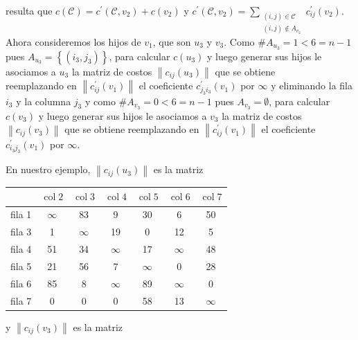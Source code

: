 \documentclass[10pt]{article}
\begin{document}
resulta que $c(\mathcal{C})=c^{\prime}\left(\mathcal{C}, v_{2}\right)+c\left(v_{2}\right)$ y $c^{\prime}\left(\mathcal{C}, v_{2}\right)=\sum_{\substack{(i, j) \in \mathcal{C} \\(i, j) \notin A_{v_{2}}}} c_{i j}^{\prime}\left(v_{2}\right)$.\\
Ahora consideremos los hijos de $v_{1}$, que son $u_{3}$ y $v_{3}$. Como $\# A_{u_{3}}=1<6=n-1$ pues $A_{u_{3}}=\left\{\left(i_{3}, j_{3}\right)\right\}$, para calcular $c\left(u_{3}\right)$ y luego generar sus hijos le asociamos a $u_{3}$ la matriz de costos $\left\|c_{i j}\left(u_{3}\right)\right\|$ que se obtiene\\
reemplazando en $\left\|c_{i j}^{\prime}\left(v_{1}\right)\right\|$ el coeficiente $c_{j_{3} i_{3}}^{\prime}\left(v_{1}\right)$ por $\infty$ y eliminando la fila $i_{3}$ y la columna $j_{3}$ y como $\# A_{v_{3}}=0<6=n-1$ pues $A_{v_{3}}=\emptyset$, para calcular $c\left(v_{3}\right)$ y luego generar sus hijos le asociamos a $v_{3}$ la matriz de costos $\left\|c_{i j}\left(v_{3}\right)\right\|$ que se obtiene reemplazando en $\left\|c_{i j}^{\prime}\left(v_{1}\right)\right\|$ el coeficiente $c_{i_{3} j_{3}}^{\prime}\left(v_{1}\right)$ por $\infty$.

En nuestro ejemplo, $\left\|c_{i j}\left(u_{3}\right)\right\|$ es la matriz

\begin{center}
\begin{tabular}{|c|c|c|c|c|c|c|}
\hline
 & $\operatorname{col} 2$ & $\operatorname{col} 3$ & $\operatorname{col} 4$ & $\operatorname{col} 5$ & $\operatorname{col} 6$ & $\operatorname{col} 7$ \\
\hline
fila 1 & $\infty$ & 83 & 9 & 30 & 6 & 50 \\
\hline
fila 3 & 1 & $\infty$ & 19 & 0 & 12 & 5 \\
\hline
fila 4 & 51 & 34 & $\infty$ & 17 & $\infty$ & 48 \\
\hline
fila 5 & 21 & 56 & 7 & $\infty$ & 0 & 28 \\
\hline
fila 6 & 85 & 8 & $\infty$ & 89 & $\infty$ & 0 \\
\hline
fila 7 & 0 & 0 & 0 & 58 & 13 & $\infty$ \\
\hline
\end{tabular}
\end{center}

y $\left\|c_{i j}\left(v_{3}\right)\right\|$ es la matriz
\end{document}
